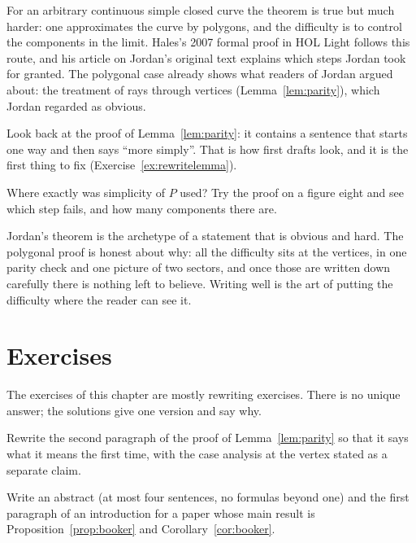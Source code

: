 \begin{remark}\label{rem:jordangeneral}
For an arbitrary continuous simple closed curve the theorem is true but much harder: one approximates the curve by polygons, and the difficulty is to control the components in the limit. Hales's 2007 formal proof in HOL Light follows this route,
and his article on Jordan's original text explains which steps Jordan took for granted. The polygonal case already shows what readers of Jordan argued about: the treatment of rays through vertices (Lemma~\ref{lem:parity}), which Jordan regarded as obvious.
\end{remark}

Look back at the proof of Lemma~\ref{lem:parity}: it contains a sentence that starts one way and then says ``more simply''. That is how first drafts look, and it is the first thing to fix (Exercise~\ref{ex:rewritelemma}).

\begin{think}
Where exactly was simplicity of $P$ used? Try the proof on a figure eight and see which step fails, and how many components there are.
\end{think}

\begin{beauty}
Jordan's theorem is the archetype of a statement that is obvious and hard. The polygonal proof is honest about why: all the difficulty sits at the vertices, in one parity check and one
picture of two sectors, and once those are written down carefully there is nothing left to believe. Writing well is the art of putting the difficulty where the reader can see it.
\end{beauty}

\section{Exercises}

The exercises of this chapter are mostly rewriting exercises. There is no unique answer; the solutions give one version and say why.

\begin{exercise}[$\star$]\label{ex:rewritelemma}
Rewrite the second paragraph of the proof of Lemma~\ref{lem:parity} so that it says what it means the first time, with the case analysis at the vertex stated as a separate claim.
\end{exercise}

\begin{exercise}[$\star$]\label{ex:abstract}
Write an abstract (at most four sentences, no formulas beyond one) and the first paragraph of an introduction for a paper whose main result is Proposition~\ref{prop:booker} and Corollary~\ref{cor:booker}.
\end{exercise}

